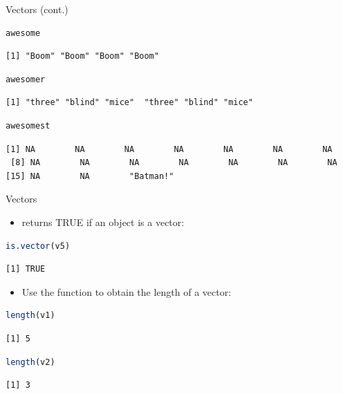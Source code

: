 \begin{frame}[fragile]{Vectors (cont.)}
\begin{lstlisting}[language=R]
awesome
\end{lstlisting}
\begin{lstlisting}[style=output]
[1] "Boom" "Boom" "Boom" "Boom"
\end{lstlisting}
\begin{lstlisting}[language=R]
awesomer
\end{lstlisting}
\begin{lstlisting}[style=output]
[1] "three" "blind" "mice"  "three" "blind" "mice"
\end{lstlisting}
\begin{lstlisting}[language=R]
awesomest
\end{lstlisting}
\begin{lstlisting}[style=output]
 [1] NA        NA        NA        NA        NA        NA        NA       
 [8] NA        NA        NA        NA        NA        NA        NA       
[15] NA        NA        "Batman!"
\end{lstlisting}
\end{frame}

\begin{frame}[fragile]{Vectors}
\begin{itemize}
  \item {} returns TRUE if an object is a vector:
\end{itemize}
\begin{lstlisting}[language=R]
is.vector(v5)
\end{lstlisting}
\begin{lstlisting}[style=output]
[1] TRUE
\end{lstlisting}
\begin{itemize}
  \item Use the  function to obtain the length of a vector:
\end{itemize}
\begin{lstlisting}[language=R]
length(v1)
\end{lstlisting}
\begin{lstlisting}[style=output]
[1] 5
\end{lstlisting}
\begin{lstlisting}[language=R]
length(v2)
\end{lstlisting}
\begin{lstlisting}[style=output]
[1] 3
\end{lstlisting}
\end{frame}

